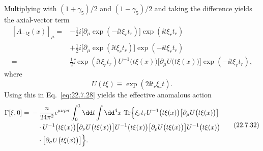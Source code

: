 Multiplying with $(1+\gamma_5)/2$ and $(1-\gamma_5)/2$ and taking the
difference yields the axial-vector term
\begin{equation}
 \begin{aligned}
 [A_{-t\xi}(x)]_\mu
 ={}&-\frac{1}{2}i
 \bigl[\partial_\mu\exp(-\ii t\xi_rt_r)\bigr]\exp(\ii t\xi_rt_r)
 \\
 &+\frac{1}{2}i
 \bigl[\partial_\mu\exp(\ii t\xi_rt_r)\bigr]\exp(-\ii t\xi_rt_r)
 \\
 ={}&\frac{1}{2}\ii\exp(\ii t\xi_rt_r)
 U^{-1}\bigl(t\xi(x)\bigr)
 \bigl[\partial_\mu U\bigl(t\xi(x)\bigr)\bigr]
 \exp(-\ii t\xi_rt_r),
 \end{aligned}
 \tag{22.7.30}\label{eq:22.7.30}
\end{equation}
where
\begin{equation}
 U(t\xi)\equiv\exp(2\ii t_r\xi_rt).
 \tag{22.7.31}\label{eq:22.7.31}
\end{equation}
Using this in Eq.~\eqref{eq:22.7.28} yields the effective anomalous action
\begin{equation}
 \begin{aligned}
 \Gamma[\xi,0]
 ={}&-\frac{n}{24\pi^2}\epsilon^{\mu\nu\rho\sigma}
 \int_0^1\dd t\int \dd^4x\,
 \operatorname{Tr}\Bigl\{
 \xi_rt_rU^{-1}\bigl(t\xi(x)\bigr)
 \bigl[\partial_\mu U\bigl(t\xi(x)\bigr)\bigr]
 \\
 &\quad{}\cdot U^{-1}\bigl(t\xi(x)\bigr)
 \bigl[\partial_\nu U\bigl(t\xi(x)\bigr)\bigr]
 U^{-1}\bigl(t\xi(x)\bigr)
 \bigl[\partial_\rho U\bigl(t\xi(x)\bigr)\bigr]
 U^{-1}\bigl(t\xi(x)\bigr)
 \\
 &\quad{}\cdot
 \bigl[\partial_\sigma U\bigl(t\xi(x)\bigr)\bigr]
 \Bigr\}.
 \end{aligned}
 \tag{22.7.32}\label{eq:22.7.32}
\end{equation}

